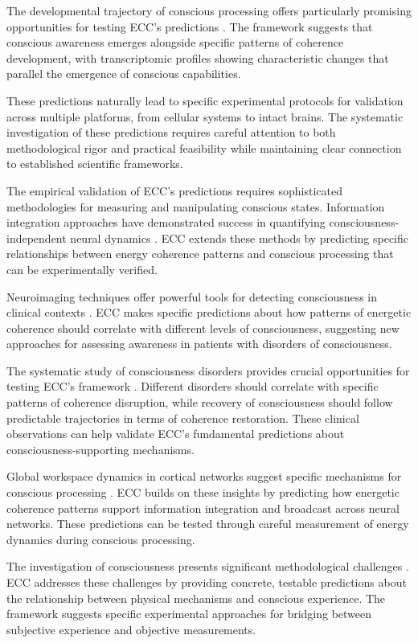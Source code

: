 \begin{refsection}
The developmental trajectory of conscious processing offers particularly promising opportunities for testing ECC's predictions \cite{DehaeneLambertz2015}. The framework suggests that conscious awareness emerges alongside specific patterns of coherence development, with transcriptomic profiles showing characteristic changes that parallel the emergence of conscious capabilities.

These predictions naturally lead to specific experimental protocols for validation across multiple platforms, from cellular systems to intact brains. The systematic investigation of these predictions requires careful attention to both methodological rigor and practical feasibility while maintaining clear connection to established scientific frameworks.

The empirical validation of ECC's predictions requires sophisticated methodologies for measuring and manipulating conscious states. Information integration approaches have demonstrated success in quantifying consciousness-independent neural dynamics \cite{Casali2013}. ECC extends these methods by predicting specific relationships between energy coherence patterns and conscious processing that can be experimentally verified.

Neuroimaging techniques offer powerful tools for detecting consciousness in clinical contexts \cite{Owen2013}. ECC makes specific predictions about how patterns of energetic coherence should correlate with different levels of consciousness, suggesting new approaches for assessing awareness in patients with disorders of consciousness.

The systematic study of consciousness disorders provides crucial opportunities for testing ECC's framework \cite{Giacino2014}. Different disorders should correlate with specific patterns of coherence disruption, while recovery of consciousness should follow predictable trajectories in terms of coherence restoration. These clinical observations can help validate ECC's fundamental predictions about consciousness-supporting mechanisms.

Global workspace dynamics in cortical networks suggest specific mechanisms for conscious processing \cite{Baars2013}. ECC builds on these insights by predicting how energetic coherence patterns support information integration and broadcast across neural networks. These predictions can be tested through careful measurement of energy dynamics during conscious processing.

The investigation of consciousness presents significant methodological challenges \cite{Seth2010}. ECC addresses these challenges by providing concrete, testable predictions about the relationship between physical mechanisms and conscious experience. The framework suggests specific experimental approaches for bridging between subjective experience and objective measurements.


\end{refsection}
